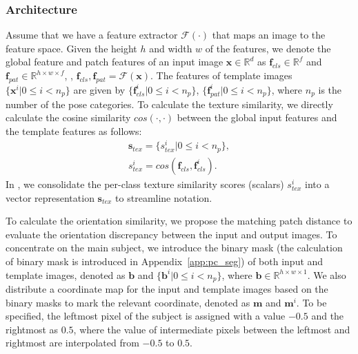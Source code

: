 \subsubsection{Architecture}\label{app:pc_arch}
Assume that we have a feature extractor $\mathcal{F}(\cdot)$ that maps an image to the feature space. Given the height $h$ and width $w$ of the features, we denote the global feature and patch features of an input image $\boldsymbol{x} \in \mathbb{R}^d$ as $\boldsymbol{f}_{cls} \in \mathbb{R}^{f}$ and $\boldsymbol{f}_{pat} \in \mathbb{R}^{h\times w\times f}$, \ie, $\boldsymbol{f}_{cls}, \boldsymbol{f}_{pat} = \mathcal{F}(\boldsymbol{x})$. The features of template images $\{\boldsymbol{x}^i | 0 \leq i < n_p\}$ are given by $\{\boldsymbol{f}_{cls}^i | 0 \leq i < n_p\}$, $\{\boldsymbol{f}_{pat}^i | 0 \leq i < n_p\}$, where $n_p$ is the number of the pose categories. To calculate the texture similarity, we directly calculate the cosine similarity $cos(\cdot, \cdot)$ between the global input features and the template features as follows:
\begin{equation}\label{eq:cls_tex}
    \begin{gathered}
 \boldsymbol{s}_{tex} = \{s_{tex}^i | 0 \leq i < n_p\}, \\
 s_{tex}^i = cos(\boldsymbol{f}_{cls}, \boldsymbol{f}_{cls}^i).
    \end{gathered}
\end{equation}
In , we consolidate the per-class texture similarity scores (scalars) $s_{tex}^i$ into a vector representation $\boldsymbol{s}_{tex}$ to streamline notation.

To calculate the orientation similarity, we propose the matching patch distance to evaluate the orientation discrepancy between the input and output images. To concentrate on the main subject, we introduce the binary mask (the calculation of binary mask is introduced in Appendix~\ref{app:pc_seg}) of both input and template images, denoted as $\boldsymbol{b}$ and $\{\boldsymbol{b}^i | 0 \leq i < n_p\}$, where $\boldsymbol{b} \in \mathbb{R}^{h \times w \times 1}$. We also distribute a coordinate map for the input and template images based on the binary masks to mark the relevant coordinate, denoted as $\boldsymbol{m}$ and $\boldsymbol{m}^i$. To be specified, the leftmost pixel of the subject is assigned with a value $-0.5$ and the rightmost as $0.5$, where the value of intermediate pixels between the leftmost and rightmost are interpolated from $-0.5$ to $0.5$.




